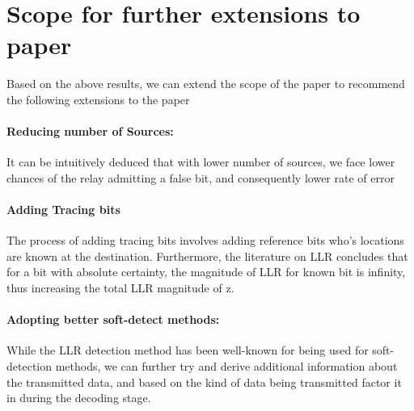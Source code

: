 \documentclass[conference]{IEEEtran}
\begin{document}
\section{Scope for further extensions to paper}
Based on the above results, we can extend the scope of the paper to recommend the following extensions to the paper
\paragraph{Reducing number of Sources:} It can be intuitively deduced that with lower number of sources, we face lower chances of the relay admitting a false bit, and consequently lower rate of error
\paragraph{Adding Tracing bits} The process of adding tracing bits involves adding reference bits who's locations are known at the destination. Furthermore, the literature on LLR concludes that for a bit with absolute certainty, the magnitude of LLR for known bit is infinity, thus increasing the total LLR magnitude of {z}.
\paragraph{Adopting better soft-detect methods:} While the LLR detection method has been well-known for being used for soft-detection methods, we can further try and derive additional information about the transmitted data, and based on the kind of data being transmitted factor it in during the decoding stage. 
\end{document}
